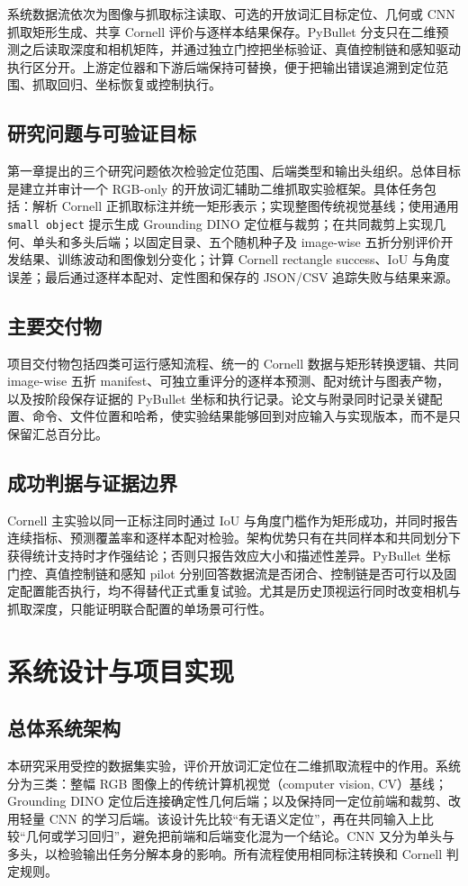 \documentclass{l4proj}
\begin{document}
系统数据流依次为图像与抓取标注读取、可选的开放词汇目标定位、几何或 CNN 抓取矩形生成、共享 Cornell 评价与逐样本结果保存。PyBullet 分支只在二维预测之后读取深度和相机矩阵，并通过独立门控把坐标验证、真值控制链和感知驱动执行区分开。上游定位器和下游后端保持可替换，便于把输出错误追溯到定位范围、抓取回归、坐标恢复或控制执行。

\section{研究问题与可验证目标}
第一章提出的三个研究问题依次检验定位范围、后端类型和输出头组织。总体目标是建立并审计一个 RGB-only 的开放词汇辅助二维抓取实验框架。具体任务包括：解析 Cornell 正抓取标注并统一矩形表示；实现整图传统视觉基线；使用通用 \texttt{small object} 提示生成 Grounding DINO 定位框与裁剪；在共同裁剪上实现几何、单头和多头后端；以固定目录、五个随机种子及 image-wise 五折分别评价开发结果、训练波动和图像划分变化；计算 Cornell rectangle success、IoU 与角度误差；最后通过逐样本配对、定性图和保存的 JSON/CSV 追踪失败与结果来源。

\section{主要交付物}
项目交付物包括四类可运行感知流程、统一的 Cornell 数据与矩形转换逻辑、共同 image-wise 五折 manifest、可独立重评分的逐样本预测、配对统计与图表产物，以及按阶段保存证据的 PyBullet 坐标和执行记录。论文与附录同时记录关键配置、命令、文件位置和哈希，使实验结果能够回到对应输入与实现版本，而不是只保留汇总百分比。

\section{成功判据与证据边界}
Cornell 主实验以同一正标注同时通过 IoU 与角度门槛作为矩形成功，并同时报告连续指标、预测覆盖率和逐样本配对检验。架构优势只有在共同样本和共同划分下获得统计支持时才作强结论；否则只报告效应大小和描述性差异。PyBullet 坐标门控、真值控制链和感知 pilot 分别回答数据流是否闭合、控制链是否可行以及固定配置能否执行，均不得替代正式重复试验。尤其是历史顶视运行同时改变相机与抓取深度，只能证明联合配置的单场景可行性。

\chapter{系统设计与项目实现}

\section{总体系统架构}
本研究采用受控的数据集实验，评价开放词汇定位在二维抓取流程中的作用。系统分为三类：整幅 RGB 图像上的传统计算机视觉（computer vision, CV）基线；Grounding DINO 定位后连接确定性几何后端；以及保持同一定位前端和裁剪、改用轻量 CNN 的学习后端。该设计先比较“有无语义定位”，再在共同输入上比较“几何或学习回归”，避免把前端和后端变化混为一个结论。CNN 又分为单头与多头，以检验输出任务分解本身的影响。所有流程使用相同标注转换和 Cornell 判定规则。
\end{document}
